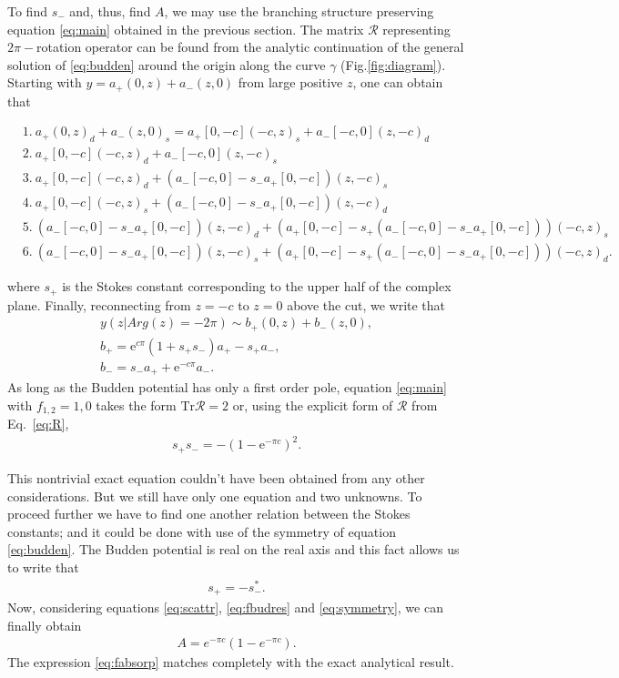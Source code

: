 \documentclass[aip,jmp,reprint]{revtex4-1}
\def\rme{\mathrm{e}}
\def\R{\bm{\mathcal{R}}}
\def\Tr{\mathrm{Tr}}
\begin{document}
To find $s_-$ and, thus, find $A$, we may use the branching structure preserving 
equation \eqref{eq:main} obtained in the previous section. The matrix $\R$ representing $2\pi-$rotation operator
can be found from the analytic continuation of the general solution of \eqref{eq:budden}
around the origin along the curve $\gamma$ (Fig.\ref{fig:diagram}). 
Starting with $y=a_+(0,z) + a_-(z,0)$ from large positive $z$, 
one can obtain that
\begin{widetext}
\begin{equation}
\begin{split}
&1.\ a_+(0,z)_d+a_-(z,0)_s=a_+[0,-c](-c,z)_s + a_-[-c,0](z,-c)_d
\\
&2.\ a_+[0,-c](-c,z)_d + a_-[-c,0](z,-c)_s 
\\
&3.\ a_+[0,-c](-c,z)_d + (a_-[-c,0] - s_- a_+[0,-c])(z,-c)_s 
\\
&4.\ a_+[0,-c](-c,z)_s + (a_-[-c,0] - s_- a_+[0,-c])(z,-c)_d 
\\
&5.\ (a_-[-c,0] - s_- a_+[0,-c])(z,-c)_d + (a_+[0,-c] - s_+ (a_-[-c,0] - s_- a_+[0,-c]))(-c,z)_s
\\
&6.\ (a_-[-c,0] - s_- a_+[0,-c])(z,-c)_s + (a_+[0,-c] - s_+ (a_-[-c,0] - s_- a_+[0,-c]))(-c,z)_d.
\end{split}
\end{equation}
\end{widetext}
where $s_+$ is the Stokes constant corresponding to the upper half of the complex plane.
Finally, reconnecting from $z=-c$ to $z=0$ above the cut, we write that
\begin{equation}
\begin{split}
y(z | Arg(z) = -2\pi) \sim b_+(0,z) + b_-(z,0),
\\
b_+ = \rme^{c \pi} (1 + s_+s_-)a_+ - s_+a_-,
\\
b_- = s_- a_+ + \rme^{-c \pi} a_-.
\label{eq:R} 
\end{split}
\end{equation}
As long as the Budden potential has only a first order pole, equation \eqref{eq:main}
with $f_{1,2}=1,0$ takes the form $\Tr\R=2$ or, using the explicit form of $\R$ from Eq.~\eqref{eq:R},
\begin{eqnarray}
s_+s_- = - (1-\rme^{- \pi c})^2.
\label{eq:fbudres}
\end{eqnarray}

This nontrivial exact equation couldn't have been obtained from any other considerations. But we
still have only one equation and two unknowns. To proceed further we have to find one another
relation between the Stokes constants; and it could be done with use of the symmetry 
of equation \eqref{eq:budden}. The Budden potential is real on the real axis and
this fact allows us to write\cite{aksymm,frsymm} that
\begin{eqnarray}
s_+ = -s_-^*.
\label{eq:symmetry}
\end{eqnarray}
Now, considering equations \eqref{eq:scattr}, \eqref{eq:fbudres} and \eqref{eq:symmetry}, we can
finally obtain 
\begin{eqnarray}
A = e^{-\pi c}(1-e^{-\pi c}).
\label{eq:fabsorp}
\end{eqnarray}
The expression \eqref{eq:fabsorp} matches completely with the exact analytical result\cite{rwbook}.
\end{document}
